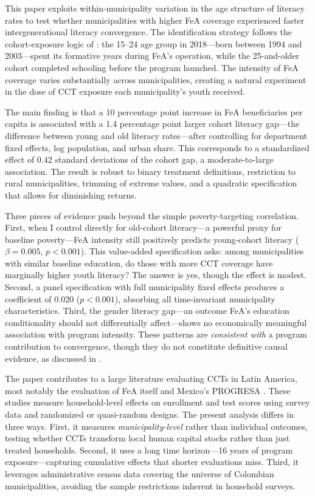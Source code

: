 \documentclass[12pt]{article}
\begin{document}
This paper exploits within-municipality variation in the age structure of literacy rates to test whether municipalities with higher FeA coverage experienced faster intergenerational literacy convergence. The identification strategy follows the cohort-exposure logic of \citet{duflo2001schooling}: the 15--24 age group in 2018---born between 1994 and 2003---spent its formative years during FeA's operation, while the 25-and-older cohort completed schooling before the program launched. The intensity of FeA coverage varies substantially across municipalities, creating a natural experiment in the dose of CCT exposure each municipality's youth received.

The main finding is that a 10 percentage point increase in FeA beneficiaries per capita is associated with a 1.4 percentage point larger cohort literacy gap---the difference between young and old literacy rates---after controlling for department fixed effects, log population, and urban share. This corresponds to a standardized effect of 0.42 standard deviations of the cohort gap, a moderate-to-large association. The result is robust to binary treatment definitions, restriction to rural municipalities, trimming of extreme values, and a quadratic specification that allows for diminishing returns.

Three pieces of evidence push beyond the simple poverty-targeting correlation. First, when I control directly for old-cohort literacy---a powerful proxy for baseline poverty---FeA intensity still positively predicts young-cohort literacy ($\beta = 0.005$, $p < 0.001$). This value-added specification asks: among municipalities with similar baseline education, do those with more CCT coverage have marginally higher youth literacy? The answer is yes, though the effect is modest. Second, a panel specification with full municipality fixed effects produces a coefficient of 0.020 ($p < 0.001$), absorbing all time-invariant municipality characteristics. Third, the gender literacy gap---an outcome FeA's education conditionality should not differentially affect---shows no economically meaningful association with program intensity. These patterns are \textit{consistent with} a program contribution to convergence, though they do not constitute definitive causal evidence, as discussed in .

The paper contributes to a large literature evaluating CCTs in Latin America, most notably the evaluation of FeA itself \citep{attanasio2005effects,attanasio2010education} and Mexico's PROGRESA \citep{schultz2004school,behrman2011much}. These studies measure household-level effects on enrollment and test scores using survey data and randomized or quasi-random designs. The present analysis differs in three ways. First, it measures \textit{municipality-level} rather than individual outcomes, testing whether CCTs transform local human capital stocks rather than just treated households. Second, it uses a long time horizon---16 years of program exposure---capturing cumulative effects that shorter evaluations miss. Third, it leverages administrative census data covering the universe of Colombian municipalities, avoiding the sample restrictions inherent in household surveys.
\end{document}

